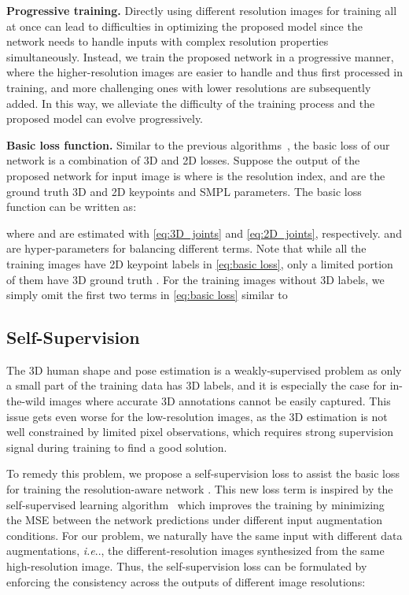 \documentclass[runningheads]{llncs}
\makeatletter
\DeclareRobustCommand\onedot{\futurelet\@let@token\@onedot}
\def\@onedot{\ifx\@let@token.\else.\null\fi\xspace}
\def\ie{\emph{i.e}\onedot, } \def\Ie{\emph{I.e}\onedot}
\makeatother
\begin{document}
\noindent \textbf{Progressive training.}
Directly using different resolution images for training all at once can lead to difficulties in optimizing the proposed model since the network needs to handle inputs with complex resolution properties simultaneously.
Instead, we train the proposed network in a progressive manner, where the higher-resolution images are easier to handle and thus first processed in training, and more challenging ones with lower resolutions are subsequently added.
In this way, we alleviate the difficulty of the training process and the proposed model can evolve progressively.


\noindent \textbf{Basic loss function.}
Similar to the previous algorithms~\cite{kanazawa2018end,kolotouros2019spin}, the basic loss of our network is a combination of 3D and 2D losses.
Suppose the output of the proposed network for input image  is  where  is the resolution index, and  are the ground truth 3D and 2D keypoints and SMPL parameters.
The basic loss function can be written as:

where  and  are estimated with \eqref{eq:3D_joints} and \eqref{eq:2D_joints}, respectively.  and  are hyper-parameters for balancing different terms.
Note that while all the training images have 2D keypoint labels  in  \eqref{eq:basic loss}, only a limited portion of them have 3D ground truth .
For the training images without 3D labels, we simply omit the first two terms in \eqref{eq:basic loss} similar to \cite{kanazawa2018end,kanazawa2019learning,kolotouros2019spin}


\subsection{Self-Supervision}


The 3D human shape and pose estimation is a weakly-supervised problem as only a small part of the training data has 3D labels, and it is especially the case for in-the-wild images where accurate 3D annotations cannot be easily captured.
This issue gets even worse for the low-resolution images, as the 3D estimation is not well constrained by limited pixel observations, which requires strong supervision signal during training to find a good solution.

To remedy this problem, we propose a self-supervision loss to assist the basic loss for training the resolution-aware network . 
This new loss term is inspired by the self-supervised learning algorithm~\cite{laine2017temporal} which improves the training by minimizing the MSE between the network predictions under different input augmentation conditions.
For our problem, we naturally have the same input with different data augmentations, \ie the different-resolution images synthesized from the same high-resolution image. 
Thus, the self-supervision loss can be formulated by enforcing the consistency across the outputs of different image resolutions:
\end{document}

